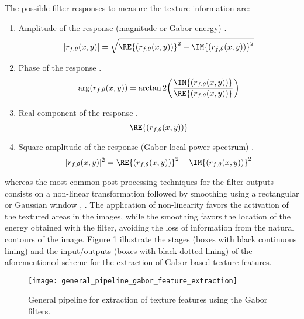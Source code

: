 The possible filter responses to measure the texture information are: 

\begin{enumerate}
    \item Amplitude of the response (magnitude or Gabor energy) \citep{Bovik.Clark.ea:TPAMI:1990}.
        \begin{equation}\label{eq:gabor_magnitude}
            |r_{f, \theta}(x,y)| = \sqrt{\RE{(r_{f, \theta}(x, y))}^2 + \IM{(r_{f, \theta}(x, y))}^2}
        \end{equation}
    \item Phase of the response \citep{Palm.Lehmann:MGV:2002}.
    \begin{equation}\label{eq:gabor_phase}
            \arg(r_{f, \theta}(x,y)) = \arctan2{\left(\frac{\IM{(r_{f, \theta}(x, y))}}{\RE{(r_{f, \theta}(x, y))}}\right)}
        \end{equation}
    \item Real component of the response \citep{Jain.Farrokhnia:IJPR:1991}.
    \begin{equation}\label{eq:gabor_real_part}
            \RE{(r_{f, \theta}(x, y))}
        \end{equation}
    \item Square amplitude of the response (Gabor local power spectrum) \citep{Grigorescu.Petkov.ea:TIP:2002}.
    \begin{equation}\label{eq:gabor_power}
            |r_{f, \theta}(x,y)|^2 = \RE{(r_{f, \theta}(x, y))}^2 + \IM{(r_{f, \theta}(x, y))}^2
        \end{equation}
\end{enumerate}
whereas the most common post-processing techniques for the filter outputs consists on a non-linear transformation followed by smoothing using a rectangular or Gaussian window \citep{Randen.Husoy:TPAMI:1999}, \citep{Clausi.EdJernigan:JPR:2000}. 
The application of non-linearity favors the activation of the textured areas in the images, while the smoothing favors the location of the energy obtained with the filter, avoiding the loss of information from the natural contours of the image. Figure \ref{fig:general_pipeline_gabor_feature_extraction} illustrate the stages (boxes with black continuous lining) and the input/outputs (boxes with black dotted lining) of the aforementioned scheme for the extraction of Gabor-based texture features.

\begin{figure}[!ht]
	\centering
	\texttt{[image: general\_pipeline\_gabor\_feature\_extraction]}
	\caption{General pipeline for extraction of texture features using the Gabor filters.}\label{fig:general_pipeline_gabor_feature_extraction}
\end{figure}

